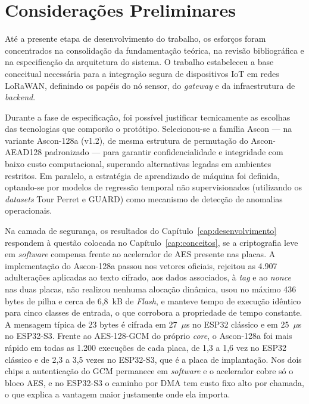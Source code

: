 \chapter{Considerações Preliminares} \label{cap:consideracoes}

Até a presente etapa de desenvolvimento do trabalho, os esforços foram concentrados na consolidação da fundamentação teórica, na revisão bibliográfica e na especificação da arquitetura do sistema. O trabalho estabeleceu a base conceitual necessária para a integração segura de dispositivos IoT em redes LoRaWAN, definindo os papéis do nó sensor, do \textit{gateway} e da infraestrutura de \textit{backend}. 

Durante a fase de especificação, foi possível justificar tecnicamente as escolhas das tecnologias que comporão o protótipo. Selecionou-se a família Ascon — na variante Ascon-128a (v1.2), de mesma estrutura de permutação do Ascon-AEAD128 padronizado — para garantir confidencialidade e integridade com baixo custo computacional, superando alternativas legadas em ambientes restritos. Em paralelo, a estratégia de aprendizado de máquina foi definida, optando-se por modelos de regressão temporal não supervisionados (utilizando os \textit{datasets} Tour Perret e GUARD) como mecanismo de detecção de anomalias operacionais.

Na camada de segurança, os resultados do Capítulo~\ref{cap:desenvolvimento} respondem à questão colocada no Capítulo~\ref{cap:conceitos}, se a criptografia leve em \textit{software} compensa frente ao acelerador de AES presente nas placas. A implementação do Ascon-128a passou nos vetores oficiais, rejeitou as 4.907 adulterações aplicadas ao texto cifrado, aos dados associados, à \textit{tag} e ao \textit{nonce} nas duas placas, não realizou nenhuma alocação dinâmica, usou no máximo 436 bytes de pilha e cerca de 6,8~kB de \textit{Flash}, e manteve tempo de execução idêntico para cinco classes de entrada, o que corrobora a propriedade de tempo constante. A mensagem típica de 23 bytes é cifrada em 27~$\mu$s no ESP32 clássico e em 25~$\mu$s no ESP32-S3. Frente ao AES-128-GCM do próprio \textit{core}, o Ascon-128a foi mais rápido em todas as 1.200 execuções de cada placa, de 1,3 a 1,6 vez no ESP32 clássico e de 2,3 a 3,5 vezes no ESP32-S3, que é a placa de implantação. Nos dois chips a autenticação do GCM permanece em \textit{software} e o acelerador cobre só o bloco AES, e no ESP32-S3 o caminho por DMA tem custo fixo alto por chamada, o que explica a vantagem maior justamente onde ela importa.

